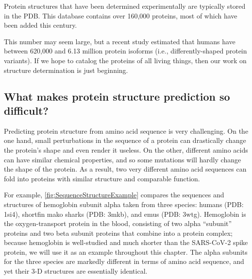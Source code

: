 Protein structures that have been determined experimentally are typically stored in the PDB. This database contains over 160,000 proteins, most of which have been added this century.

This number may seem large, but a recent study estimated that humans have between 620,000 and 6.13 million protein isoforms (i.e., differently-shaped protein variants). If we hope to catalog the proteins of all living things, then our work on structure determination is just beginning.

\FloatBarrier
{}
\subsection{What makes protein structure prediction so difficult?}

Predicting protein structure from amino acid sequence is very challenging. On the one hand, small perturbations in the sequence of a protein can drastically change the protein's shape and even render it useless. On the other, different amino acids can have similar chemical properties, and so some mutations will hardly change the shape of the protein. As a result, two very different amino acid sequences can fold into proteins with similar structure and comparable function.

For example, \autoref{fig:SequenceStructureExample} compares the sequences and structures of hemoglobin subunit alpha taken from three species: humans (PDB: 1si4), shortfin mako sharks (PDB: 3mkb), and emus (PDB: 3wtg). Hemoglobin is the oxygen-transport protein in the blood, consisting of two alpha ``subunit'' proteins and two beta subunit proteins that combine into a protein complex; because hemoglobin is well-studied and much shorter than the SARS-CoV-2 spike protein, we will use it as an example throughout this chapter. The alpha subunits for the three species are markedly different in terms of amino acid sequence, and yet their 3-D structures are essentially identical.\\

